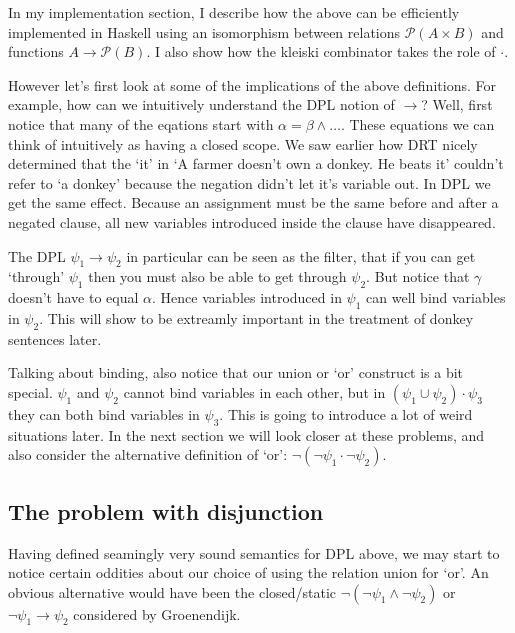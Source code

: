 \documentclass[12pt]{article}
\begin{document}
In my implementation section, I describe how the above can be efficiently implemented in Haskell using an isomorphism between relations $\mathcal{P}(A\times B)$ and functions $A\to\mathcal{P}(B)$. I also show how the kleiski combinator takes the role of $\cdot$.

However let's first look at some of the implications of the above definitions. For example, how can we intuitively understand the DPL notion of $\rightarrow$? Well, first notice that many of the eqations start with $\alpha=\beta\wedge\dots$. These equations we can think of intuitively as having a closed scope. We saw earlier how DRT nicely determined that the `it' in `A farmer doesn't own a donkey. He beats it' couldn't refer to `a donkey' because the negation didn't let it's variable out. In DPL we get the same effect. Because an assignment must be the same before and after a negated clause, all new variables introduced inside the clause have disappeared.

The DPL $\psi_1\rightarrow\psi_2$ in particular can be seen as the filter, that if you can get `through' $\psi_1$ then you must also be able to get through $\psi_2$. But notice that $\gamma$ doesn't have to equal $\alpha$. Hence variables introduced in $\psi_1$ can well bind variables in $\psi_2$. This will show to be extreamly important in the treatment of donkey sentences later.

Talking about binding, also notice that our union or `or' construct is a bit special. $\psi_1$ and $\psi_2$ cannot bind variables in each other, but in $(\psi_1\cup\psi_2)\cdot\psi_3$ they can both bind variables in $\psi_3$. This is going to introduce a lot of weird situations later. In the next section we will look closer at these problems, and also consider the alternative definition of `or': $\neg(\neg\psi_1\cdot\neg\psi_2)$.

\subsection{The problem with disjunction}

Having defined seamingly very sound semantics for DPL above, we may start to notice certain oddities about our choice of using the relation union for `or'. An obvious alternative would have been the closed/static $\neg(\neg\psi_1\wedge\neg\psi_2)$ or $\neg\psi_1\rightarrow\psi_2$ considered by Groenendijk\cite{groenendijk1991dynamic}.
\end{document}
